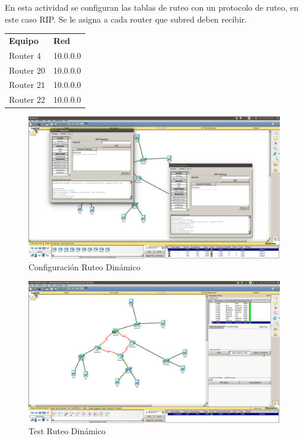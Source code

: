 \documentclass[spanish]{udpreport}
\begin{document}
En esta actividad se configuran las tablas de ruteo con un protocolo de ruteo, en este caso RIP. Se le asigna a cada router que subred deben recibir.
\begin{table}[H]
\centering
\begin{tabular}{p{3cm}|p{4cm}}
\textbf{Equipo} & \textbf{Red} \\
       Router 4 & 10.0.0.0\\
       Router 20 & 10.0.0.0\\
       Router 21 & 10.0.0.0\\
       Router 22 & 10.0.0.0\\

\end{tabular}
\end{table}
\begin{figure}[H]
	\centering
	\includegraphics[scale=.25]{imagenes/ruteo_dinamic.png}
	\caption{Configuración Ruteo Dinámico}
	\label{fig:Figura 4.1}
\end{figure}

\begin{figure}[H]
	\centering
	\includegraphics[scale=.25]{imagenes/test_rdinamic.png}
	\caption{Test Ruteo Dinámico}
	\label{fig:Figura 4.2}
\end{figure}
\end{document}
